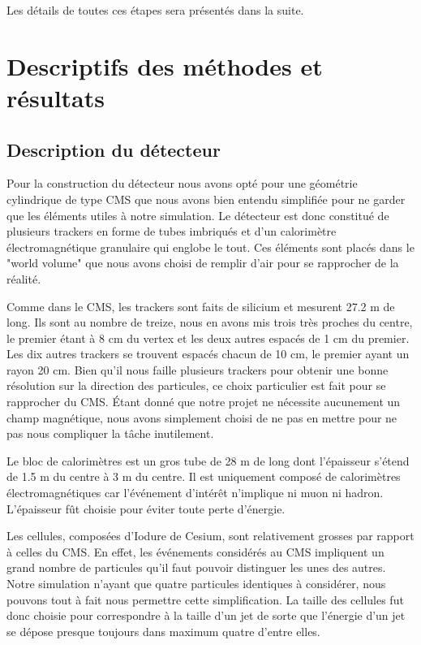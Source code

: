 \documentclass[11pt]{article}
\begin{document}
Les d\'etails de toutes ces \'etapes sera pr\'esent\'es dans la suite.





		    \section{Descriptifs des méthodes et résultats}

\subsection{Description du détecteur}

Pour la construction du détecteur nous avons opté pour une géométrie cylindrique
de type CMS que nous avons bien entendu simplifiée pour ne garder que les
éléments utiles à notre simulation. Le détecteur est donc constitué de plusieurs
trackers en forme de tubes imbriqués et d'un calorimètre
électromagnétique granulaire qui englobe le tout. Ces éléments sont placés dans
le "world volume" que nous avons choisi de remplir d'air pour se rapprocher de
la réalité.

Comme dans le CMS, les trackers sont faits de silicium et mesurent 27.2 m de
long. Ils sont au nombre de treize, nous en avons mis trois très proches du
centre, le premier étant à 8 cm du vertex et les deux autres espacés de 1 cm du
premier. Les dix autres trackers se trouvent espacés chacun de 10 cm, le premier
ayant un rayon 20 cm. Bien qu'il nous faille plusieurs trackers pour obtenir
une bonne résolution sur la direction des particules, ce choix particulier est
fait pour se rapprocher du CMS. Étant donné que notre projet ne nécessite
aucunement un champ magnétique, nous avons simplement choisi de ne pas en
mettre pour ne pas nous compliquer la tâche inutilement. 

Le bloc de calorimètres est un gros tube de 28 m de long dont
l'épaisseur s'étend de 1.5 m du centre à 3 m du centre. Il est uniquement
composé de calorimètres électromagnétiques car l'événement d'intérêt n'implique
ni muon ni hadron. L'épaisseur fût choisie pour éviter toute perte d'énergie.

Les cellules, composées d'Iodure de Cesium, sont relativement grosses par
rapport à celles du CMS. En effet, les événements considérés au CMS impliquent
un grand nombre de particules qu'il faut pouvoir distinguer les unes des
autres. Notre simulation n'ayant que quatre particules identiques à considérer,
nous pouvons tout à fait nous permettre cette simplification. La taille des
cellules fut donc choisie pour correspondre à la taille d'un jet de sorte que
l'énergie d'un jet se dépose presque toujours dans maximum quatre d'entre elles.
\end{document}
